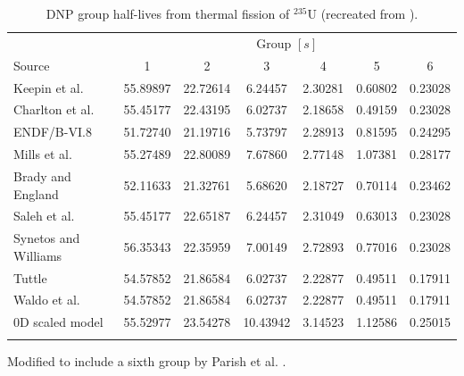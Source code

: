 \begin{table}[!h]
\centering
\begin{threeparttable}
\caption{\gls{DNP} group half-lives from thermal fission of $^{235}$U (recreated from \cite{parish1999status}).}
\begin{tabular}{lcccccc}
\hline
 & \multicolumn{6}{c}{Group $[s]$} \\
Source & 1 & 2 & 3 & 4 & 5 & 6 \\
\hline
Keepin et al. \cite{keepin1957delayed}   & 55.89897 & 22.72614 & 6.24457 & 2.30281 & 0.60802 & 0.23028 \\
Charlton et al. \cite{charlton1996delayed}\tnote{*} & 55.45177 & 22.43195 & 6.02737 & 2.18658 & 0.49159 & 0.23028 \\
ENDF/B-VI.8 \cite{endf6}   & 51.72740 & 21.19716 & 5.73797 & 2.28913 & 0.81595 & 0.24295 \\
Mills et al. \cite{mills1991study}    & 55.27489 & 22.80089 & 7.67860 & 2.77148 & 1.07381 & 0.28177\\
Brady and England \cite{brady1989delayed} & 52.11633 & 21.32761 & 5.68620 & 2.18727 & 0.70114 & 0.23462 \\
Saleh et al. \cite{saleh1997measurements} & 55.45177 & 22.65187 & 6.24457 & 2.31049 & 0.63013 & 0.23028 \\
Synetos and Williams \cite{synetos1983delayed}\tnote{*} & 56.35343 & 22.35959 & 7.00149 & 2.72893 & 0.77016 & 0.23028 \\
Tuttle \cite{tuttle1975delayed}    & 54.57852 & 21.86584 & 6.02737 & 2.22877 & 0.49511 & 0.17911 \\
Waldo et al.\cite{waldo1981delayed}    & 54.57852 & 21.86584 & 6.02737 & 2.22877 & 0.49511 & 0.17911 \\
0D scaled model & 55.52977 & 23.54278 & 10.43942 & 3.14523 & 1.12586 & 0.25015\\
\hline
\label{tab:macro-half-lives-net}
\end{tabular}
\begin{tablenotes}
\item[*] Modified to include a sixth group by Parish et al. \cite{parish1999status}.
\end{tablenotes}
\end{threeparttable}
\end{table}

